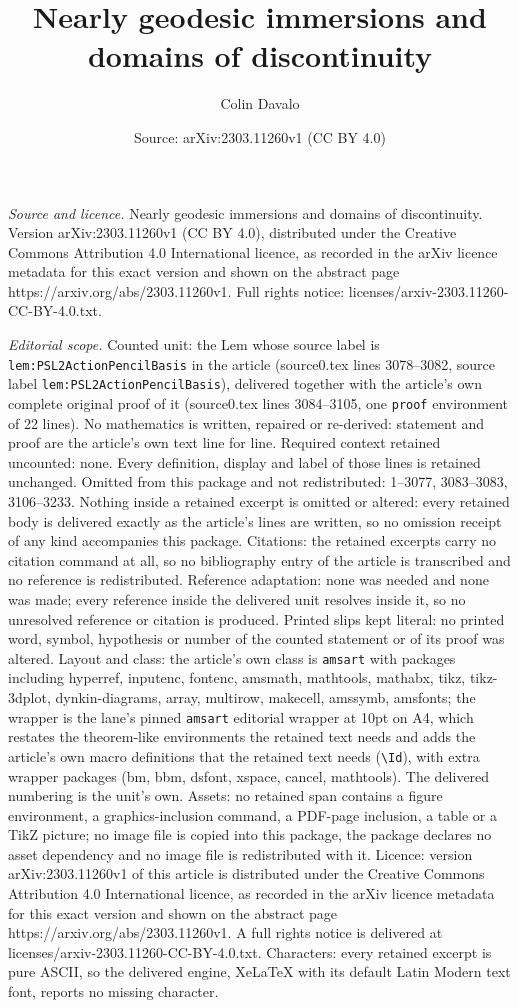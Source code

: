 \documentclass[10pt,a4paper]{amsart}
\title[Nearly geodesic immersions and domains of discontinuity]{Nearly geodesic immersions and domains of discontinuity}
\author{Colin Davalo}
\date{Source: arXiv:2303.11260v1 (CC BY 4.0)}
\begin{document}
\maketitle

\noindent\emph{Source and licence.} Nearly geodesic immersions and domains of discontinuity. Version arXiv:2303.11260v1 (CC BY 4.0), distributed under the Creative Commons Attribution 4.0 International licence, as recorded in the arXiv licence metadata for this exact version and shown on the abstract page https://arxiv.org/abs/2303.11260v1. Full rights notice: licenses/arxiv-2303.11260-CC-BY-4.0.txt.\par\smallskip

\noindent\textit{Editorial scope.} Counted unit: the Lem whose source label is \texttt{lem:PSL2ActionPencilBasis} in the article (source0.tex lines 3078--3082, source label \texttt{lem:PSL2ActionPencilBasis}), delivered together with the article's own complete original proof of it (source0.tex lines 3084--3105, one \texttt{proof} environment of 22 lines). No mathematics is written, repaired or re-derived: statement and proof are the article's own text line for line. Required context retained uncounted: none. Every definition, display and label of those lines is retained unchanged. Omitted from this package and not redistributed: 1--3077, 3083--3083, 3106--3233. Nothing inside a retained excerpt is omitted or altered: every retained body is delivered exactly as the article's lines are written, so no omission receipt of any kind accompanies this package. Citations: the retained excerpts carry no citation command at all, so no bibliography entry of the article is transcribed and no reference is redistributed. Reference adaptation: none was needed and none was made; every reference inside the delivered unit resolves inside it, so no unresolved reference or citation is produced. Printed slips kept literal: no printed word, symbol, hypothesis or number of the counted statement or of its proof was altered. Layout and class: the article's own class is \texttt{amsart} with packages including hyperref, inputenc, fontenc, amsmath, mathtools, mathabx, tikz, tikz-3dplot, dynkin-diagrams, array, multirow, makecell, amssymb, amsfonts; the wrapper is the lane's pinned \texttt{amsart} editorial wrapper at 10pt on A4, which restates the theorem-like environments the retained text needs and adds the article's own macro definitions that the retained text needs (\texttt{\textbackslash Id}), with extra wrapper packages (bm, bbm, dsfont, xspace, cancel, mathtools). The delivered numbering is the unit's own. Assets: no retained span contains a figure environment, a graphics-inclusion command, a PDF-page inclusion, a table or a TikZ picture; no image file is copied into this package, the package declares no asset dependency and no image file is redistributed with it. Licence: version arXiv:2303.11260v1 of this article is distributed under the Creative Commons Attribution 4.0 International licence, as recorded in the arXiv licence metadata for this exact version and shown on the abstract page https://arxiv.org/abs/2303.11260v1. A full rights notice is delivered at licenses/arxiv-2303.11260-CC-BY-4.0.txt. Characters: every retained excerpt is pure ASCII, so the delivered engine, XeLaTeX with its default Latin Modern text font, reports no missing character.
\end{document}
